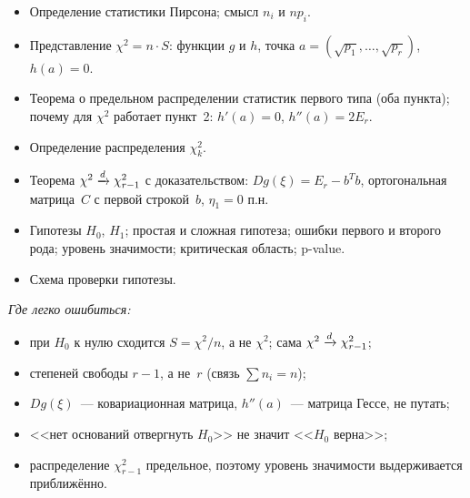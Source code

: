 \begin{keybox}
  \begin{itemize}
    \item Определение статистики Пирсона; смысл $n_i$ и $n p_i$.
    \item Представление $\chi^2 = n \cdot S$: функции $g$ и $h$, точка $a = (\sqrt{p_1}, \ldots, \sqrt{p_r})$,
          $h(a) = 0$.
    \item Теорема о предельном распределении статистик первого типа (оба пункта);
          почему для $\chi^2$ работает пункт~2: $h'(a) = 0$, $h''(a) = 2E_r$.
    \item Определение распределения $\chi^2_k$.
    \item Теорема $\chi^2 \xrightarrow{d} \chi^2_{r-1}$ с доказательством: $D g(\xi) = E_r - b^T b$,
          ортогональная матрица~$C$ с первой строкой~$b$, $\eta_1 = 0$ п.н.
    \item Гипотезы $H_0$, $H_1$; простая и сложная гипотеза; ошибки первого и второго рода;
          уровень значимости; критическая область; p-value.
    \item Схема проверки гипотезы.
  \end{itemize}
  \emph{Где легко ошибиться:}
  \begin{itemize}
    \item при $H_0$ к нулю сходится $S = \chi^2 / n$, а не $\chi^2$; сама $\chi^2 \xrightarrow{d} \chi^2_{r-1}$;
    \item степеней свободы $r - 1$, а не~$r$ (связь $\sum n_i = n$);
    \item $D g(\xi)$~--- ковариационная матрица, $h''(a)$~--- матрица Гессе, не путать;
    \item <<нет оснований отвергнуть $H_0$>> не значит <<$H_0$ верна>>;
    \item распределение $\chi^2_{r-1}$ предельное, поэтому уровень значимости выдерживается
          приближённо.
  \end{itemize}
\end{keybox}
